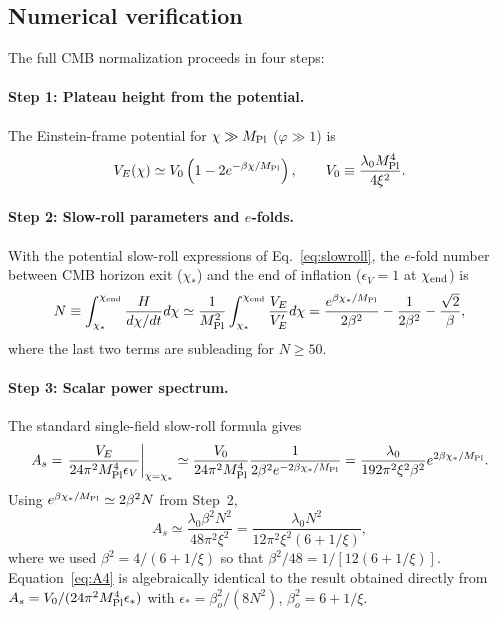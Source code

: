 \documentclass[pdflatex,sn-mathphys-num]{sn-jnl}
\newcommand{\MP}{M_{\rm Pl}}
\theoremstyle{thmstyleone}
\begin{document}
\begin{appendices}

\section{Numerical verification}

The full CMB normalization proceeds in four steps:

\paragraph{Step 1: Plateau height from the potential.} The Einstein-frame potential for $\chi\gg\MP$ ($\varphi\gg1$) is
\begin{equation}
V_E(\chi)\simeq V_0\left(1-2e^{-\beta\chi/\MP}\right),
\qquad
V_0\equiv\frac{\lambda_0\MP^4}{4\xi^2}.
\label{eq:A1}
\end{equation}

\paragraph{Step 2: Slow-roll parameters and $e$-folds.} With the potential slow-roll expressions of Eq.~\eqref{eq:slowroll}, the $e$-fold number between CMB horizon exit ($\chi_*$) and the end of inflation ($\epsilon_V=1$ at $\chi_{\rm end}$) is
\begin{equation}
N\equiv\int_{\chi_*}^{\chi_{\rm end}}\frac{H}{d\chi/dt}d\chi
\simeq\frac{1}{\MP^2}\int_{\chi_*}^{\chi_{\rm end}}\frac{V_E}{V_E'}d\chi
=\frac{e^{\beta\chi_*/\MP}}{2\beta^2}-\frac{1}{2\beta^2}-\frac{\sqrt2}{\beta},
\label{eq:A2}
\end{equation}
where the last two terms are subleading for $N\geq50$.

\paragraph{Step 3: Scalar power spectrum.} The standard single-field slow-roll formula gives
\begin{equation}
A_s=\left.\frac{V_E}{24\pi^2\MP^4\epsilon_V}\right|_{\chi=\chi_*}
\simeq\frac{V_0}{24\pi^2\MP^4}\frac{1}{2\beta^2 e^{-2\beta\chi_*/\MP}}
=\frac{\lambda_0}{192\pi^2\xi^2\beta^2}e^{2\beta\chi_*/\MP}.
\label{eq:A3}
\end{equation}
Using $e^{\beta\chi_*/\MP}\simeq2\beta^2 N$ from Step~2,
\begin{equation}
A_s\simeq\frac{\lambda_0\beta^2 N^2}{48\pi^2\xi^2}
=\frac{\lambda_0 N^2}{12\pi^2\xi^2(6+1/\xi)},
\label{eq:A4}
\end{equation}
where we used $\beta^2=4/(6+1/\xi)$ so that $\beta^2/48=1/[12(6+1/\xi)]$. Equation~\eqref{eq:A4} is algebraically identical to the result obtained directly from $A_s=V_0/(24\pi^2\MP^4\epsilon_*)$ with $\epsilon_*=\beta_o^2/(8N^2)$, $\beta_o^2=6+1/\xi$.


\end{appendices}
\end{document}
